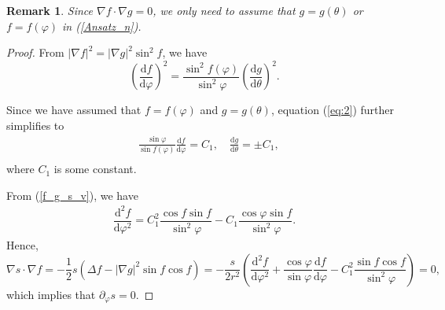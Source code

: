 \documentclass[10pt, a4paper]{article}
\newtheorem*{rem}{Remark}
\newcommand\dd{\mathrm{d}}
\newcommand\pp{\partial}
\begin{document}

\begin{rem}
Since $\nabla f \cdot \nabla g = 0$, we only need to assume that $g = g(\theta)$ or $f = f(\varphi)$ in (\ref{Ansatz_n}).
\end{rem}


\begin{proof}

From $|\nabla f|^2 = |\nabla g|^2 \sin^2 f$, we have
\begin{equation}\label{eq:2}
\left(\frac{\dd f}{\dd \varphi}\right)^2 = \frac{\sin^2 f(\varphi)}{\sin^2 \varphi}\left(\frac{\dd g}{\dd \theta}\right)^2.
\end{equation}

Since we have assumed that $f = f(\varphi)$ and $g = g(\theta)$, equation (\ref{eq:2}) further simplifies to
\begin{equation}\label{f_g_s_v}
\begin{aligned}
& \frac{\sin \varphi}{\sin f(\varphi)} \frac{\dd f}{\dd \varphi} = C_1, \quad \frac{\dd g}{\dd \theta}  = \pm C_1, \\
\end{aligned}
\end{equation}
where $C_1$ is some constant.

From (\ref{f_g_s_v}), we have 
\begin{equation}
\begin{aligned}
\dfrac{\dd^2 f}{\dd \varphi^2} = C_1^2 \dfrac{\cos f \sin f}{\sin^2 \varphi} - C_1 \dfrac{\cos \varphi \sin f}{\sin^2 \varphi}.
\end{aligned}
\end{equation}
Hence,
\begin{equation}
\nabla s \cdot \nabla f =  - \frac{1}{2} s (\Delta f - |\nabla g|^2 \sin f \cos f) = -\dfrac{s}{2r^2} \left(\dfrac{\dd^2 f}{\dd \varphi^2} + \dfrac{\cos \varphi}{\sin \varphi} \dfrac{\dd f}{\dd \varphi} - C_1^2 \dfrac{\sin f \cos f}{\sin^2 \varphi} \right) = 0,  
\end{equation}
which implies that $\pp_{\varphi} s = 0$.


\end{proof}
\end{document}
